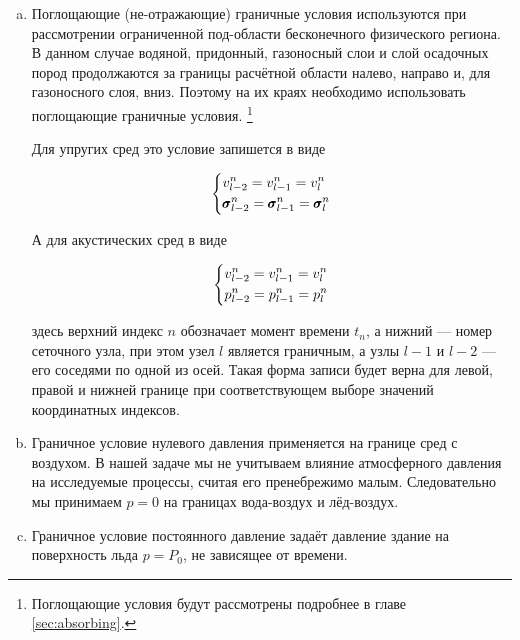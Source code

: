\begin{enumerate}[a.]
    \item Поглощающие (не-отражающие) граничные условия используются при рассмотрении ограниченной под-области бесконечного физического региона. В данном случае водяной, придонный, газоносный слои и слой осадочных пород продолжаются за границы расчётной области налево, направо и, для газоносного слоя, вниз. Поэтому на их краях необходимо использовать поглощающие граничные условия. \footnote{Поглощающие условия будут рассмотрены подробнее в главе \ref{sec:absorbing}.}
    
    Для упругих сред это условие запишется в виде
    
    \begin{equation}
    \begin{dcases}
        v_{l-2}^n = 
        v_{l-1}^n = 
        v_{l}^n \\
        \pmb{\sigma}_{l-2}^n = 
        \pmb{\sigma}_{l-1}^n = 
        \pmb{\sigma}_{l}^n
    \end{dcases}
    \end{equation}
    
    А для акустических сред в виде
    
    \begin{equation}
    \begin{dcases}
        v_{l-2}^n = 
        v_{l-1}^n = 
        v_{l}^n \\
        p_{l-2}^n = 
        p_{l-1}^n = 
        p_{l}^n
    \end{dcases}
    \end{equation}
    
    здесь верхний индекс $n$ обозначает момент времени $t_n$, а нижний --- номер сеточного узла, при этом узел $l$ является граничным, а узлы $l-1$ и $l-2$ --- его соседями по одной из осей. Такая форма записи будет верна для левой, правой и нижней границе при соответствующем выборе значений координатных индексов.
    
    \item Граничное условие нулевого давления применяется на границе сред с воздухом. В нашей задаче мы не учитываем влияние атмосферного давления на исследуемые процессы, считая его пренебрежимо малым. Следовательно мы принимаем $p=0$ на границах вода-воздух и лёд-воздух.
    
    \item Граничное условие постоянного давление задаёт давление здание на поверхность льда  $p=P_0$, не зависящее от времени.
\end{enumerate}

